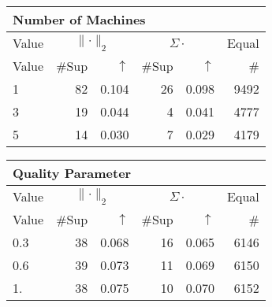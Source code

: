 \begin{center}
\renewcommand{\tabcolsep}{4pt}
\renewcommand{\arraystretch}{1.1}
\begin{customnormal}
\begin{tabular}{lrrrrr}
\multicolumn{6}{l}{Number of Machines}\\
\toprule
\multicolumn{1}{c}{Value} & \multicolumn{2}{c}{$\lVert \cdot \rVert_2$} & \multicolumn{2}{c}{$\Sigma \cdot$} & \multicolumn{1}{c}{Equal} \\ 
\cmidrule(lr){1-1} \cmidrule(lr){2-3} \cmidrule(lr){4-5}  \cmidrule(lr){6-6}
Value & \#Sup & $\uparrow$ & \#Sup & $\uparrow$ & \# \\ 
\midrule
1 & 82 & 0.104 & 26 & 0.098 & 9492 \\ 
3 & 19 & 0.044 & 4 & 0.041 & 4777 \\ 
5 & 14 & 0.030 & 7 & 0.029 & 4179 \\ 
\bottomrule
\end{tabular}


\end{customnormal}
\end{center}
\begin{center}
\renewcommand{\tabcolsep}{4pt}
\renewcommand{\arraystretch}{1.1}
\begin{customnormal}
\begin{tabular}{lrrrrr}
\multicolumn{6}{l}{Quality Parameter}\\
\toprule
\multicolumn{1}{c}{Value} & \multicolumn{2}{c}{$\lVert \cdot \rVert_2$} & \multicolumn{2}{c}{$\Sigma \cdot$} & \multicolumn{1}{c}{Equal} \\ 
\cmidrule(lr){1-1} \cmidrule(lr){2-3} \cmidrule(lr){4-5}  \cmidrule(lr){6-6}
Value & \#Sup & $\uparrow$ & \#Sup & $\uparrow$ & \# \\ 
\midrule
0.3 & 38 & 0.068 & 16 & 0.065 & 6146 \\ 
0.6 & 39 & 0.073 & 11 & 0.069 & 6150 \\ 
1. & 38 & 0.075 & 10 & 0.070 & 6152 \\ 
\bottomrule
\end{tabular}


\end{customnormal}
\end{center}
